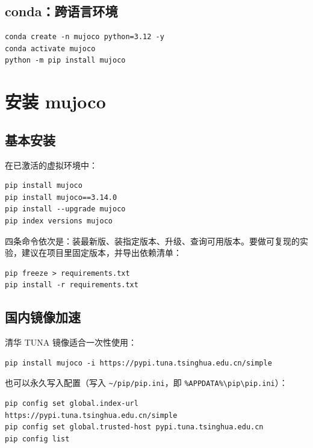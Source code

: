 \subsection{conda：跨语言环境}

\begin{lstlisting}[style=shell]
conda create -n mujoco python=3.12 -y
conda activate mujoco
python -m pip install mujoco
\end{lstlisting}

\section{安装 mujoco}

\subsection{基本安装}

在已激活的虚拟环境中：

\begin{lstlisting}[style=shell]
pip install mujoco
pip install mujoco==3.14.0
pip install --upgrade mujoco
pip index versions mujoco
\end{lstlisting}

四条命令依次是：装最新版、装指定版本、升级、查询可用版本。要做可复现的实验，建议在项目里固定版本，并导出依赖清单：

\begin{lstlisting}[style=shell]
pip freeze > requirements.txt
pip install -r requirements.txt
\end{lstlisting}

\subsection{国内镜像加速}

清华 TUNA 镜像适合一次性使用：

\begin{lstlisting}[style=shell]
pip install mujoco -i https://pypi.tuna.tsinghua.edu.cn/simple
\end{lstlisting}

也可以永久写入配置（写入 \texttt{\textasciitilde{}/pip/pip.ini}，即 \texttt{\%APPDATA\%\textbackslash{}pip\textbackslash{}pip.ini}）：

\begin{lstlisting}[style=shell]
pip config set global.index-url https://pypi.tuna.tsinghua.edu.cn/simple
pip config set global.trusted-host pypi.tuna.tsinghua.edu.cn
pip config list
\end{lstlisting}

